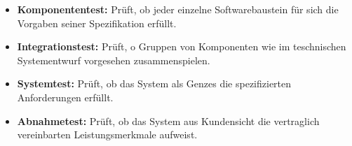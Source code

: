 \begin{itemize}
      \item \textbf{Komponententest:} Prüft, ob jeder einzelne Softwarebaustein für sich die Vorgaben seiner Spezifikation erfüllt.
      \item \textbf{Integrationstest:} Prüft, o Gruppen von Komponenten wie im teschnischen Systementwurf vorgesehen zusammenspielen.
      \item \textbf{Systemtest:} Prüft, ob das System als Genzes die spezifizierten Anforderungen erfüllt.
      \item \textbf{Abnahmetest:} Prüft, ob das System aus Kundensicht die vertraglich vereinbarten Leistungsmerkmale aufweist.
\end{itemize}
